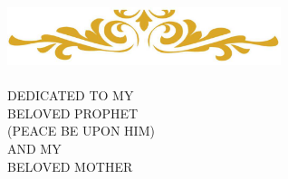 \newpage

\vskip8cm

\begin{center}
	\vskip15cm
	\includegraphics[width=8cm, height=2cm ]{CONTENT/GFX/Dedication.eps}
	
	
	\huge{DEDICATED
		TO MY\\ BELOVED PROPHET\\ (PEACE BE UPON HIM) \\
		AND MY\\ BELOVED
		MOTHER
	}
	
	
	
\end{center}
